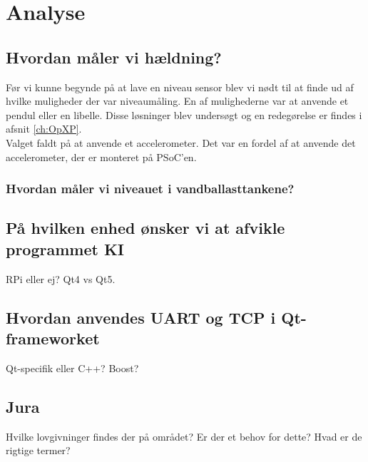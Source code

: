 \section{Analyse}
\subsection{Hvordan måler vi hældning?}
Før vi kunne begynde på at lave en niveau sensor blev vi nødt til at finde ud af hvilke muligheder der var niveaumåling. En af mulighederne var at anvende et pendul eller en libelle. Disse løsninger blev undersøgt og en redegørelse er findes i afsnit \ref{ch:OpXP}.\\
Valget faldt på at anvende et accelerometer. Det var en fordel af at anvende det accelerometer, der er monteret på PSoC'en.

\subsubsection{Hvordan måler vi niveauet i vandballasttankene?}

\subsection{På hvilken enhed ønsker vi at afvikle programmet KI}
RPi eller ej? Qt4 vs Qt5.
\subsection{Hvordan anvendes UART og TCP i Qt-frameworket}
Qt-specifik eller C++? Boost? 
\subsection{Jura}
Hvilke lovgivninger findes der på området? Er der et behov for dette? Hvad er de rigtige termer? 
